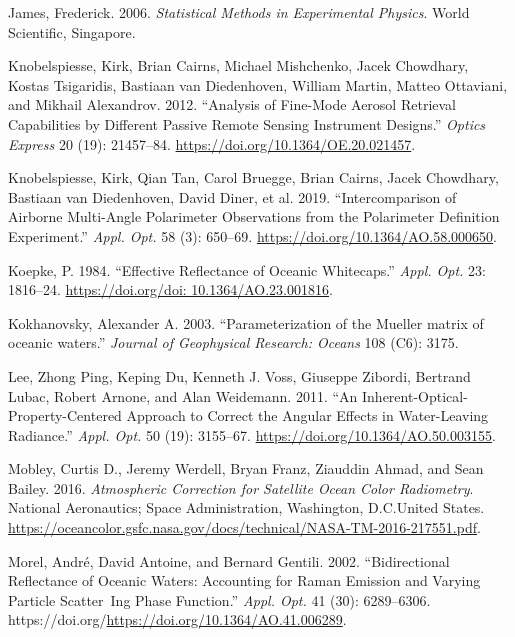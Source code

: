 \documentclass[
  11pt,
  letterpaper,
  DIV=11,
  numbers=noendperiod]{scrreprt}
\newlength{\cslhangindent}
\newenvironment{CSLReferences}[2] %
 {\begin{list}{}{%
  \setlength{\itemindent}{0pt}
  \setlength{\leftmargin}{0pt}
  \setlength{\parsep}{0pt}
  \ifodd #1
   \setlength{\leftmargin}{\cslhangindent}
   \setlength{\itemindent}{-1\cslhangindent}
  \fi
  \setlength{\itemsep}{#2\baselineskip}}}
 {\end{list}}
\begin{document}
\begin{CSLReferences}{1}{0}
James, Frederick. 2006. \emph{Statistical Methods in Experimental
Physics}. World Scientific, Singapore.

Knobelspiesse, Kirk, Brian Cairns, Michael Mishchenko, Jacek Chowdhary,
Kostas Tsigaridis, Bastiaan van Diedenhoven, William Martin, Matteo
Ottaviani, and Mikhail Alexandrov. 2012. {``Analysis of Fine-Mode
Aerosol Retrieval Capabilities by Different Passive Remote Sensing
Instrument Designs.''} \emph{Optics Express} 20 (19): 21457--84.
\url{https://doi.org/10.1364/OE.20.021457}.

Knobelspiesse, Kirk, Qian Tan, Carol Bruegge, Brian Cairns, Jacek
Chowdhary, Bastiaan van Diedenhoven, David Diner, et al. 2019.
{``Intercomparison of Airborne Multi-Angle Polarimeter Observations from
the Polarimeter Definition Experiment.''} \emph{Appl. Opt.} 58 (3):
650--69. \url{https://doi.org/10.1364/AO.58.000650}.

Koepke, P. 1984. {``Effective Reflectance of Oceanic Whitecaps.''}
\emph{Appl. Opt.} 23: 1816--24.
\href{https://doi.org/doi:\%2010.1364/AO.23.001816}{https://doi.org/doi:
10.1364/AO.23.001816}.

Kokhanovsky, Alexander A. 2003. {``{Parameterization of the Mueller
matrix of oceanic waters}.''} \emph{Journal of Geophysical Research:
Oceans} 108 (C6): 3175.

Lee, Zhong Ping, Keping Du, Kenneth J. Voss, Giuseppe Zibordi, Bertrand
Lubac, Robert Arnone, and Alan Weidemann. 2011. {``An
Inherent-Optical-Property-Centered Approach to Correct the Angular
Effects in Water-Leaving Radiance.''} \emph{Appl. Opt.} 50 (19):
3155--67. \url{https://doi.org/10.1364/AO.50.003155}.

Mobley, Curtis D., Jeremy Werdell, Bryan Franz, Ziauddin Ahmad, and Sean
Bailey. 2016. \emph{Atmospheric Correction for Satellite Ocean Color
Radiometry}. National Aeronautics; Space Administration, Washington,
D.C.United States.
\url{https://oceancolor.gsfc.nasa.gov/docs/technical/NASA-TM-2016-217551.pdf}.

Morel, André, David Antoine, and Bernard Gentili. 2002. {``Bidirectional
Reflectance of Oceanic Waters: Accounting for Raman Emission and Varying
Particle Scatter~Ing Phase Function.''} \emph{Appl. Opt.} 41 (30):
6289--6306. https://doi.org/\url{https://doi.org/10.1364/AO.41.006289}.


\end{CSLReferences}
\end{document}
